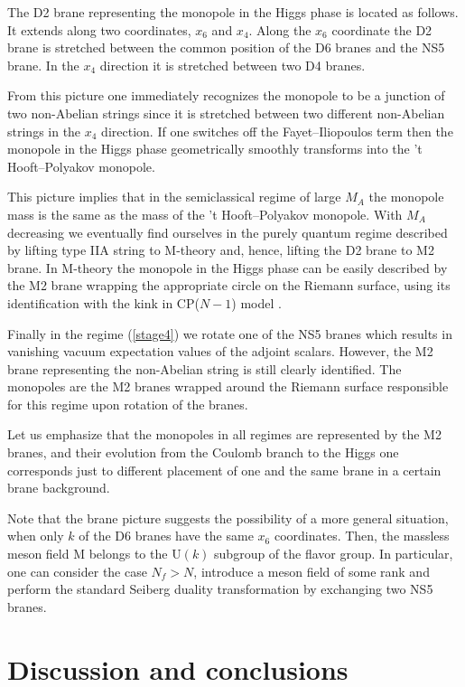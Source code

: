 \documentclass[epsfig,12pt]{article}
\begin{document}
The D2 brane representing the monopole in the Higgs phase
is located as follows. It   extends along two coordinates, $x_6$ and $x_4$.
Along the $x_6$ coordinate the D2 brane is stretched between the common
position of the D6 branes and the NS5 brane. In the $x_4$ direction
it is stretched between two D4 branes.

From this picture one immediately recognizes
the monopole to be a junction of two non-Abelian strings
since it is stretched between two
different non-Abelian strings in the $x_4$ direction.
If one switches off the Fayet--Iliopoulos term then the monopole in
the Higgs phase geometrically smoothly transforms
into the 't Hooft--Polyakov monopole.

This picture implies that in the
semiclassical regime of large $M_A$  the monopole
mass is  the same as the mass of the 't Hooft--Polyakov
monopole. With $M_A$ decreasing we eventually find ourselves
in the purely quantum regime
described by lifting type  IIA string to M-theory
and, hence,  lifting the D2 brane to M2 brane.
In M-theory the monopole in the Higgs phase can be easily described
by the M2 brane wrapping the appropriate circle on the  Riemann surface,
using its identification with the kink in CP($N-1$) model \cite{Dorey}.

Finally in the regime (\ref {stage4}) we rotate one of the NS5 branes
which results in vanishing vacuum expectation values of the adjoint scalars.
However, the M2 brane representing the non-Abelian string is still
clearly identified. The monopoles are the M2 branes wrapped around
the Riemann surface responsible for this regime upon rotation
of the branes.

Let us emphasize that the monopoles in all regimes
are represented by the M2 branes, and their
evolution from the Coulomb  branch to the Higgs one
corresponds just to different placement of one and
the same brane in a certain brane background.

Note that the brane picture suggests the possibility of a more general situation,
when only $k$ of the D6 branes have the same $x_6$ coordinates.
Then, the massless meson field M belongs to the U$(k)$ subgroup of
the flavor group. In particular, one can consider the case $N_f>N$,
introduce a meson field of some rank and perform the standard Seiberg
duality transformation by exchanging two NS5 branes.


\section{Discussion and conclusions}
\label{conc}
\end{document}
